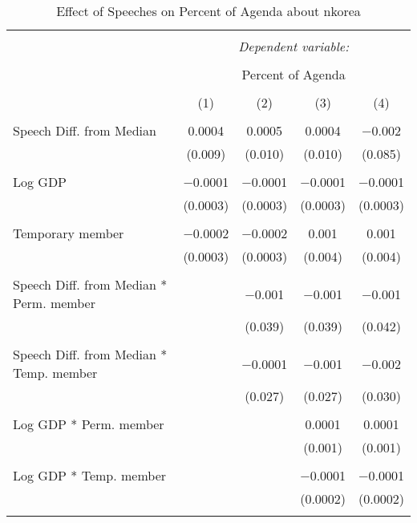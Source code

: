 
\begin{table}[!htbp] \centering 
  \caption{Effect of Speeches on Percent of Agenda about  nkorea} 
  \label{} 
\begin{tabular}{@{\extracolsep{5pt}}lcccc} 
\\[-1.8ex]\hline 
\hline \\[-1.8ex] 
 & \multicolumn{4}{c}{\textit{Dependent variable:}} \\ 
\cline{2-5} 
\\[-1.8ex] & \multicolumn{4}{c}{Percent of Agenda} \\ 
\\[-1.8ex] & (1) & (2) & (3) & (4)\\ 
\hline \\[-1.8ex] 
 Speech Diff. from Median & 0.0004 & 0.0005 & 0.0004 & $-$0.002 \\ 
  & (0.009) & (0.010) & (0.010) & (0.085) \\ 
  & & & & \\ 
 Log GDP & $-$0.0001 & $-$0.0001 & $-$0.0001 & $-$0.0001 \\ 
  & (0.0003) & (0.0003) & (0.0003) & (0.0003) \\ 
  & & & & \\ 
 Temporary member & $-$0.0002 & $-$0.0002 & 0.001 & 0.001 \\ 
  & (0.0003) & (0.0003) & (0.004) & (0.004) \\ 
  & & & & \\ 
 Speech Diff. from Median * Perm. member &  & $-$0.001 & $-$0.001 & $-$0.001 \\ 
  &  & (0.039) & (0.039) & (0.042) \\ 
  & & & & \\ 
 Speech Diff. from Median * Temp. member &  & $-$0.0001 & $-$0.001 & $-$0.002 \\ 
  &  & (0.027) & (0.027) & (0.030) \\ 
  & & & & \\ 
 Log GDP * Perm. member &  &  & 0.0001 & 0.0001 \\ 
  &  &  & (0.001) & (0.001) \\ 
  & & & & \\ 
 Log GDP * Temp. member &  &  & $-$0.0001 & $-$0.0001 \\ 
  &  &  & (0.0002) & (0.0002) \\ 
  & & & & \\ 

\end{tabular}
\end{table}
